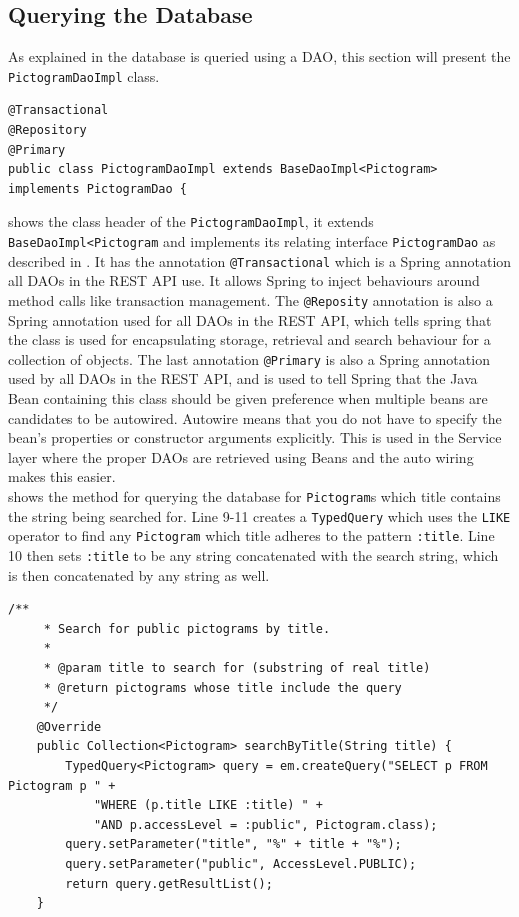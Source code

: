 \subsection{Querying the Database}
As explained in  the database is queried using a DAO, this section will present the \texttt{PictogramDaoImpl} class.

\begin{lstlisting}[float, floatplacement=h, caption={The class header of the \texttt{PictogramDao}, along with its annotations.},label={lst:pictogramDaoImpl}]
@Transactional
@Repository
@Primary
public class PictogramDaoImpl extends BaseDaoImpl<Pictogram> implements PictogramDao {
\end{lstlisting}

 shows the class header of the \texttt{PictogramDaoImpl}, it extends \texttt{BaseDaoImpl<Pictogram} and implements its relating interface \texttt{PictogramDao} as described in .
It has the annotation \texttt{@Transactional} which is a Spring annotation all DAOs in the REST API use.
It allows Spring to inject behaviours around method calls like transaction management.
The \texttt{@Reposity} annotation is also a Spring annotation used for all DAOs in the REST API, which tells spring that the class is used for encapsulating storage, retrieval and search behaviour for a collection of objects.
The last annotation \texttt{@Primary} is also a Spring annotation used by all DAOs in the REST API, and is used to tell Spring that the Java Bean  containing this class should be given preference when multiple beans are candidates to be autowired.
Autowire means that you do not have to specify the bean's properties or constructor arguments explicitly. 
This is used in the Service layer where the proper DAOs are retrieved using Beans and the auto wiring makes this easier.
\\

 shows the method for querying the database for \texttt{Pictogram}s which title contains the string being searched for.
Line 9-11 creates a \texttt{TypedQuery} which uses the \texttt{LIKE} operator to find any \texttt{Pictogram} which title adheres to the pattern \texttt{:title}.
Line 10 then sets \texttt{:title} to be any string concatenated with the search string, which is then concatenated by any string as well.
\begin{lstlisting}[float, floatplacement=h, caption={The method which searches through all \texttt{Pictogram}s by their titles.},label={lst:pictogramByTitle}]
    /**
     * Search for public pictograms by title.
     *
     * @param title to search for (substring of real title)
     * @return pictograms whose title include the query
     */
    @Override
    public Collection<Pictogram> searchByTitle(String title) {
        TypedQuery<Pictogram> query = em.createQuery("SELECT p FROM Pictogram p " +
            "WHERE (p.title LIKE :title) " +
            "AND p.accessLevel = :public", Pictogram.class);
        query.setParameter("title", "%" + title + "%");
        query.setParameter("public", AccessLevel.PUBLIC);
        return query.getResultList();
    }
\end{lstlisting}

